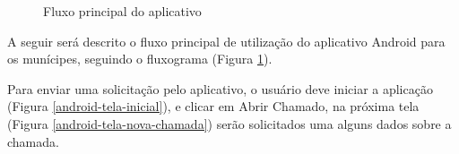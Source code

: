\documentclass[
	article,			%
	11pt,				%
	oneside,			%
	a4paper,			%
	english,			%
	brazil,				%
	sumario=tradicional
	]{abntex2}
\begin{document}
\begin{figure}[!htbp]
 \centering
 \caption{\label{fluxo-app}Fluxo principal do aplicativo}
\end{figure}

A seguir será descrito o fluxo principal de utilização do aplicativo Android para os munícipes, seguindo o fluxograma (Figura \ref{fluxo-app}).

Para enviar uma solicitação pelo aplicativo, o usuário deve iniciar a aplicação (Figura \ref{android-tela-inicial}), e clicar em Abrir Chamado, na próxima tela (Figura \ref{android-tela-nova-chamada}) serão solicitados uma alguns dados sobre a chamada.
\end{document}
